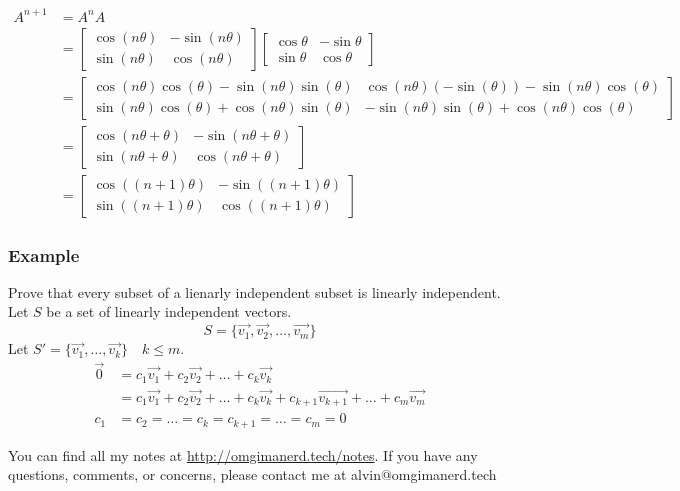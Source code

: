 \documentclass[letterpaper, 12pt]{math}
\begin{document}
\begin{align*}
  A^{n+1} &= A^nA \\
  &= \begin{bmatrix}
    \cos(n\theta) & -\sin(n\theta) \\
    \sin(n\theta) & \cos(n\theta)
  \end{bmatrix}\begin{bmatrix}
    \cos\theta & -\sin\theta \\
    \sin\theta & \cos\theta
  \end{bmatrix} \\
  &= \begin{bmatrix}
    \cos(n\theta)\cos(\theta)-\sin(n\theta)\sin(\theta) &
      \cos(n\theta)(-\sin(\theta))-\sin(n\theta)\cos(\theta) \\
    \sin(n\theta)\cos(\theta)+\cos(n\theta)\sin(\theta) &
      -\sin(n\theta)\sin(\theta)+\cos(n\theta)\cos(\theta)
  \end{bmatrix} \\
  &= \begin{bmatrix}
    \cos(n\theta+\theta) & -\sin(n\theta+\theta) \\
    \sin(n\theta+\theta) & \cos(n\theta+\theta)
  \end{bmatrix} \\
  &= \begin{bmatrix}
    \cos((n+1)\theta) & -\sin((n+1)\theta) \\
    \sin((n+1)\theta) & \cos((n+1)\theta)
  \end{bmatrix}
\end{align*}

\subsubsection*{Example}
Prove that every subset of a lienarly independent subset is linearly
independent. Let \( S \) be a set of linearly independent vectors.
\[ S = \{\vec{v_1},\vec{v_2},\dots,\vec{v_m}\} \]
Let \( S' = \{\vec{v_1},\dots,\vec{v_k}\} \quad k\le m \).
\begin{align*}
  \vec{0} &= c_1\vec{v_1}+c_2\vec{v_2}+\dots+c_k\vec{v_k} \\
  &= c_1\vec{v_1}+c_2\vec{v_2}+\dots+c_k\vec{v_k}+
    c_{k+1}\overrightarrow{v_{k+1}}+\dots+c_m\vec{v_m} \\
  c_1 &= c_2 = \dots = c_k = c_{k+1} = \dots = c_m = 0
\end{align*}

\begin{center}
  You can find all my notes at \url{http://omgimanerd.tech/notes}. If you have
  any questions, comments, or concerns, please contact me at
  alvin@omgimanerd.tech
\end{center}
\end{document}
